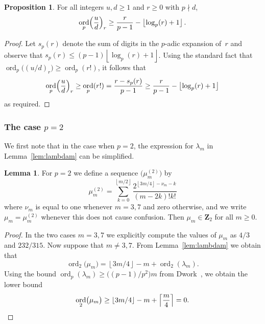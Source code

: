 \documentclass[a4paper,11pt]{article}
\numberwithin{equation}{section}
\providecommand{\floor}[1]{\left\lfloor#1\right\rfloor}   %
\providecommand{\ceil}[1]{\left\lceil#1\right\rceil}   %
\newcommand{\ZZ}{\mathbf{Z}} %
\DeclareMathOperator{\ord}{ord}          %
\theoremstyle{definition}
\newtheorem{lem}[thm]{Lemma}
\newtheorem{prop}[thm]{Proposition}
\begin{document}
\begin{prop} \label{prop:rfac}
For all integers $u, d \geq 1$ and $r \geq 0$ with $p \nmid d$, 
\begin{equation}
\ord_p\Bigl(\frac{u}{d}\Bigr)_r \geq \frac{r}{p-1} - \floor{\log_p(r) + 1}.
\end{equation}
\end{prop}

\begin{proof}
Let $s_p(r)$ denote the sum of digits in the $p$-adic expansion of~$r$ 
and observe that $s_p(r) \leq (p-1)\floor{\log_p(r) + 1}$.  Using the 
standard fact that $\ord_p\bigl((u/d)_r\bigr) \geq \ord_p(r!)$, 
it follows that 
\begin{equation}
\ord_p\Bigl(\frac{u}{d}\Bigr)_r \geq \ord_p(r!) = \frac{r - s_p(r)}{p-1} \geq \frac{r}{p-1} - \floor{\log_p(r) + 1}
\end{equation}
as required.
\end{proof}

\subsubsection{The case $p = 2$}

We first note that in the case when $p = 2$, the expression for 
$\lambda_m$ in Lemma~\ref{lem:lambdam} can be simplified.

\begin{lem} \label{lem:mu2}
For $p = 2$ we define a sequence $\bigl(\mu_m^{(2)}\bigr)$ by 
\begin{equation}
\mu_m^{(2)} = 
    \sum_{k=0}^{\floor{m/2}} \frac{2^{\floor{3m/4} - \nu_m - k}}{(m-2k)! k!}
\end{equation}
where $\nu_m$ is equal to one whenever $m = 3, 7$ and zero otherwise, 
and we write $\mu_m =\mu_m^{(2)}$ whenever this does not cause confusion. 
Then $\mu_m \in \ZZ_2$ for all $m \geq 0$.
\end{lem}

\begin{proof}
In the two cases $m = 3, 7$ we explicitly compute the values of 
$\mu_m$ as $4/3$ and $232/315$.  Now suppose that $m \neq 3, 7$. 
From Lemma~\ref{lem:lambdam} we obtain that 
\begin{equation*}
\ord_2 \bigl(\mu_m\bigr) 
    = \floor{3m/4} - m + \ord_2(\lambda_m).
\end{equation*}
Using the bound $\ord_p(\lambda_m) \geq \bigl((p-1)/p^2\bigr) m$ from 
Dwork~\citep[pp.~55--57]{Dwork1962}, we obtain the lower bound 
\begin{equation*}
\ord_2 \bigl(\mu_m\bigr) 
    \geq \floor{3m/4} - m + \ceil{\frac{m}{4}} = 0. \qedhere
\end{equation*}
\end{proof}
\end{document}
